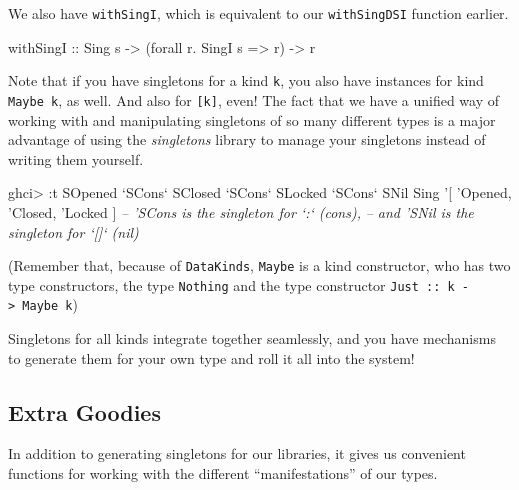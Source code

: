 \documentclass[]{article}
\newenvironment{Shaded}{\begin{snugshade}}{\end{snugshade}}
\newcommand{\CharTok}[1]{\textcolor[rgb]{0.31,0.60,0.02}{#1}}
\newcommand{\CommentTok}[1]{\textcolor[rgb]{0.56,0.35,0.01}{\textit{#1}}}
\newcommand{\DataTypeTok}[1]{\textcolor[rgb]{0.13,0.29,0.53}{#1}}
\newcommand{\FunctionTok}[1]{\textcolor[rgb]{0.00,0.00,0.00}{#1}}
\newcommand{\NormalTok}[1]{#1}
\newcommand{\OtherTok}[1]{\textcolor[rgb]{0.56,0.35,0.01}{#1}}
\begin{document}
We also have \texttt{withSingI}, which is equivalent to our \texttt{withSingDSI}
function earlier.

\begin{Shaded}
\begin{Highlighting}[]
\OtherTok{withSingI ::} \DataTypeTok{Sing}\NormalTok{ s }\OtherTok{->}\NormalTok{ (forall r}\FunctionTok{.} \DataTypeTok{SingI}\NormalTok{ s }\OtherTok{=>}\NormalTok{ r) }\OtherTok{->}\NormalTok{ r}
\end{Highlighting}
\end{Shaded}

Note that if you have singletons for a kind \texttt{k}, you also have instances
for kind \texttt{Maybe\ k}, as well. And also for \texttt{{[}k{]}}, even! The
fact that we have a unified way of working with and manipulating singletons of
so many different types is a major advantage of using the \emph{singletons}
library to manage your singletons instead of writing them yourself.

\begin{Shaded}
\begin{Highlighting}[]
\NormalTok{ghci}\FunctionTok{>} \FunctionTok{:}\NormalTok{t }\DataTypeTok{SOpened} \OtherTok{`SCons`} \DataTypeTok{SClosed} \OtherTok{`SCons`} \DataTypeTok{SLocked} \OtherTok{`SCons`} \DataTypeTok{SNil}
\DataTypeTok{Sing} \CharTok{'[ '}\DataTypeTok{Opened}\NormalTok{, }\CharTok{'Closed, '}\DataTypeTok{Locked}\NormalTok{ ]}
\CommentTok{-- 'SCons is the singleton for `:` (cons),}
\CommentTok{-- and 'SNil is the singleton for `[]` (nil)}
\end{Highlighting}
\end{Shaded}

(Remember that, because of \texttt{DataKinds}, \texttt{Maybe} is a kind
constructor, who has two type constructors, the type
\texttt{\textquotesingle{}Nothing} and the type constructor
\texttt{\textquotesingle{}Just\ ::\ k\ -\textgreater{}\ Maybe\ k})

Singletons for all kinds integrate together seamlessly, and you have mechanisms
to generate them for your own type and roll it all into the system!

\hypertarget{extra-goodies}{%
\subsection{Extra Goodies}\label{extra-goodies}}

In addition to generating singletons for our libraries, it gives us convenient
functions for working with the different ``manifestations'' of our types.
\end{document}
